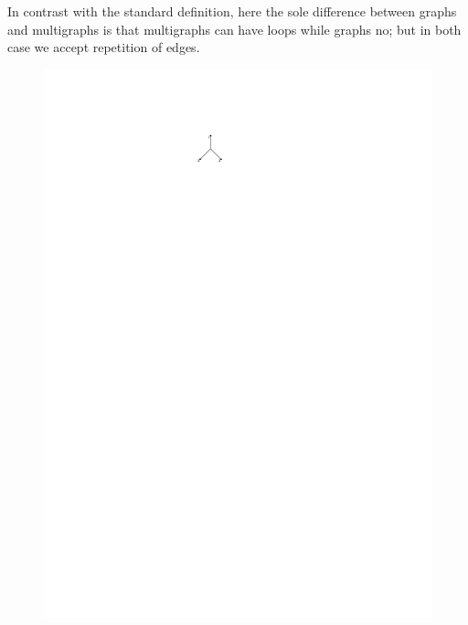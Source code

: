 \documentclass[a4paper]{article}
\theoremstyle{definition}
\begin{document}
In contrast with the standard definition, here the sole difference between graphs and multigraphs is that multigraphs can have loops while graphs no; but in both case we accept repetition of edges.
\begin{figure}[htbp]
\begin{center}
\includegraphics[scale=1.5]{fig/he1}
\hspace{2cm}

\end{center}
\end{figure}
\end{document}
